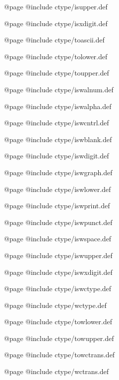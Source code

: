 @page
@include ctype/isupper.def

@page
@include ctype/isxdigit.def

@page
@include ctype/toascii.def

@page
@include ctype/tolower.def

@page
@include ctype/toupper.def

@page
@include ctype/iswalnum.def

@page
@include ctype/iswalpha.def

@page
@include ctype/iswcntrl.def

@page
@include ctype/iswblank.def

@page
@include ctype/iswdigit.def

@page
@include ctype/iswgraph.def

@page
@include ctype/iswlower.def

@page
@include ctype/iswprint.def

@page
@include ctype/iswpunct.def

@page
@include ctype/iswspace.def

@page
@include ctype/iswupper.def

@page
@include ctype/iswxdigit.def

@page
@include ctype/iswctype.def

@page
@include ctype/wctype.def

@page
@include ctype/towlower.def

@page
@include ctype/towupper.def

@page
@include ctype/towctrans.def

@page
@include ctype/wctrans.def


